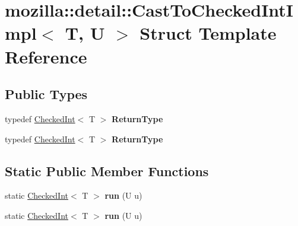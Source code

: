 \hypertarget{structmozilla_1_1detail_1_1_cast_to_checked_int_impl}{\section{mozilla\-:\-:detail\-:\-:Cast\-To\-Checked\-Int\-Impl$<$ T, U $>$ Struct Template Reference}
\label{structmozilla_1_1detail_1_1_cast_to_checked_int_impl}
}
\subsection*{Public Types}
\begin{DoxyCompactItemize}
\item 
\hypertarget{structmozilla_1_1detail_1_1_cast_to_checked_int_impl_a7665f8dc2aab887262b947c7cc8b5d24}{typedef \hyperlink{classmozilla_1_1_checked_int}{Checked\-Int}$<$ T $>$ {\bfseries Return\-Type}}\label{structmozilla_1_1detail_1_1_cast_to_checked_int_impl_a7665f8dc2aab887262b947c7cc8b5d24}

\item 
\hypertarget{structmozilla_1_1detail_1_1_cast_to_checked_int_impl_a7665f8dc2aab887262b947c7cc8b5d24}{typedef \hyperlink{classmozilla_1_1_checked_int}{Checked\-Int}$<$ T $>$ {\bfseries Return\-Type}}\label{structmozilla_1_1detail_1_1_cast_to_checked_int_impl_a7665f8dc2aab887262b947c7cc8b5d24}

\end{DoxyCompactItemize}
\subsection*{Static Public Member Functions}
\begin{DoxyCompactItemize}
\item 
\hypertarget{structmozilla_1_1detail_1_1_cast_to_checked_int_impl_a2291ad7db3c2da1de625af3dcd4bc24e}{static \hyperlink{classmozilla_1_1_checked_int}{Checked\-Int}$<$ T $>$ {\bfseries run} (U u)}\label{structmozilla_1_1detail_1_1_cast_to_checked_int_impl_a2291ad7db3c2da1de625af3dcd4bc24e}

\item 
\hypertarget{structmozilla_1_1detail_1_1_cast_to_checked_int_impl_a2291ad7db3c2da1de625af3dcd4bc24e}{static \hyperlink{classmozilla_1_1_checked_int}{Checked\-Int}$<$ T $>$ {\bfseries run} (U u)}\label{structmozilla_1_1detail_1_1_cast_to_checked_int_impl_a2291ad7db3c2da1de625af3dcd4bc24e}

\end{DoxyCompactItemize}
